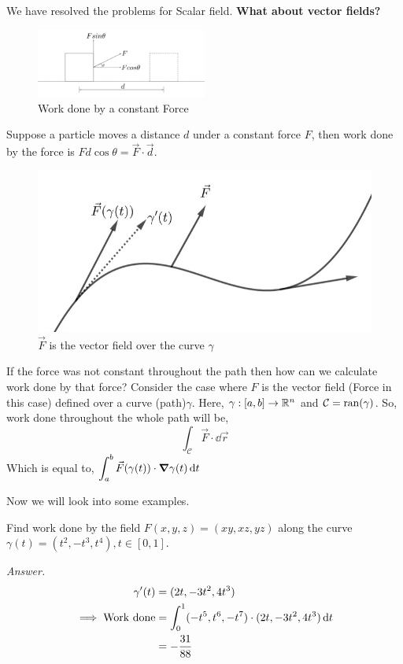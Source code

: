 \documentclass[../Analysis-3.tex]{subfiles}
\begin{document}
We have resolved the problems for Scalar field. \textbf{What about vector fields?}
\begin{figure}[H]
  \centering
  \includegraphics[width=0.5\textwidth]{../figures/lec-23.2.png}
  \caption{Work done by a constant Force}
\end{figure}
Suppose a particle moves a distance $d$ under a constant force $F$, then work done by the force is $Fd\cos{\theta} = \vec{F}\cdot\vec{d}$.


\begin{figure}
  \centering
  \includegraphics[width=.98\linewidth]{../figures/lec-23.3.png}
  \caption{$\vec{F}$ is the vector field over the curve $\gamma$}
\end{figure}

If the force was not constant throughout the path then how can we calculate work done by that force?
Consider the case where $F$ is the vector field (Force in this case) defined over a curve (path)$\gamma$. Here, $\gamma : [a,b] \to \mathbb{R}^n$ and $\mathcal{C} = \operatorname{ran}(\gamma)$. So, work done throughout the whole path will be,
\[\int_{\mathcal{C}} \vec{F}\cdot \dd\vec{r}\]
Which is equal to, $\displaystyle\int_a^b \vec{F}(\gamma(t))\cdot \grad \gamma(t)\, \dd t$

Now we will look into some examples.

\begin{Eg}{}{}
  Find work done by the field $F(x,y,z) = (xy,xz,yz)$ along the curve $\gamma(t) = (t^2,-t^3,t^4),t \in [0,1]$.

  \textit{Answer.} \begin{align*}
    \gamma'(t)                            & = (2t,-3t^2,4t^3)                                      \\
    \implies \text{Work done\index{Work}} & = \int_0^1 (-t^5,t^6,-t^7)\cdot(2t,-3t^2,4t^3)\, \dd t \\
                                          & = -\frac{31}{88}
  \end{align*}
\end{Eg}
\end{document}

